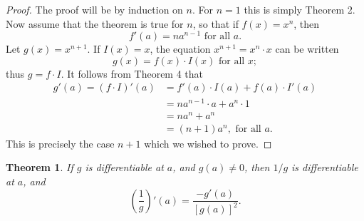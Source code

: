 \documentclass{article}
\newtheorem{theorem}{Theorem}
\begin{document}
\begin{proof}
  The proof will be by induction on $n$. For $n = 1$ this is simply Theorem 2.
  Now assume that the theorem is true for $n$, so that if $f(x) = x^n$, then
  \begin{equation*}
    f'(a) = na^{n-1} \text{ for all } a.
  \end{equation*}
  Let $g(x) = x^{n+1}$. If $I(x) = x$, the equation $x^{n+1} = x^n \cdot x$
  can be written \begin{equation*}
    g(x) = f(x) \cdot I(x) \text{ for all } x;
  \end{equation*} thus $g = f \cdot I$. It follows from Theorem 4 that
  \begin{align*}
    g'(a) = (f \cdot I)'(a) &= f'(a) \cdot I(a) + f(a) \cdot I'(a) \\
      &= na^{n - 1} \cdot a + a^n \cdot 1 \\
      &= na^n + a^n \\
      &= (n + 1)a^n, \text{ for all } a.
  \end{align*}
  This is precisely the case $n + 1$ which we wished to prove.
\end{proof}

\begin{theorem}
  If $g$ is differentiable at $a$, and $g(a) \neq 0$, then $1/g$ is
  differentiable at $a$, and \begin{equation*}
    \left(\frac{1}{g}\right)'(a) = \frac{-g'(a)}{[g(a)]^2}.
  \end{equation*}
\end{theorem}
\end{document}
